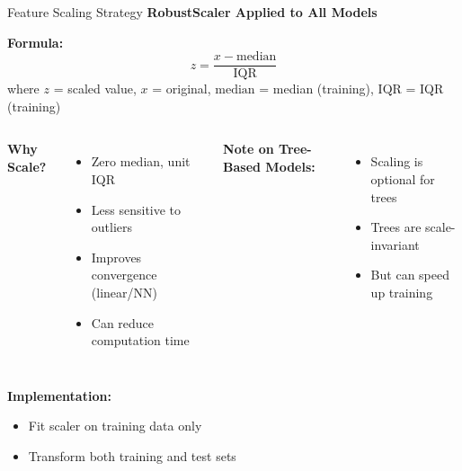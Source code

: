 \documentclass[aspectratio=169,11pt]{beamer}
\begin{document}
\begin{frame}{Feature Scaling Strategy}
\textbf{RobustScaler Applied to All Models}

\vspace{0.2cm}
\textbf{Formula:}
\begin{equation*}
z = \frac{x - \text{median}}{\text{IQR}}
\end{equation*}
\vspace{-0.2cm}
{\small where $z$ = scaled value, $x$ = original, $\text{median}$ = median (training), $\text{IQR}$ = IQR (training)}

\vspace{0.2cm}
\begin{columns}[T]
\textbf{Why Scale?}
\begin{itemize}
    \item Zero median, unit IQR
    \item Less sensitive to outliers
    \item Improves convergence (linear/NN)
    \item Can reduce computation time
\end{itemize}

\textbf{Note on Tree-Based Models:}
\begin{itemize}
    \item Scaling is \textcolor{primaryblue}{optional} for trees
    \item Trees are scale-invariant
    \item But can speed up training
\end{itemize}
\end{columns}

\vspace{0.3cm}
\textbf{Implementation:}
\begin{itemize}
    \item Fit scaler on training data only
    \item Transform both training and test sets
\end{itemize}
\end{frame}
\end{document}
